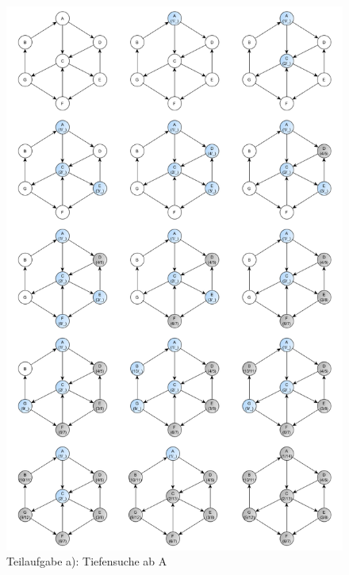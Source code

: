 \documentclass[12pt]{scrartcl}
\begin{document}
\begin{figure}[h!]
\begin{center}
\includegraphics[scale=0.35]{ATiefensucheComplete.png}
\caption{Teilaufgabe a): Tiefensuche ab A}
\end{center}
\end{figure}

\newpage
\end{document}
